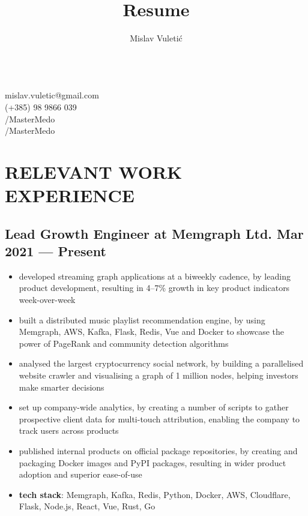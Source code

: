 \documentclass{article}
\begin{document}
\title{Resume}
\author{Mislav Vuletić}

\begin{multicols}{2}
  \fontsize{20}{20}\bfseries
  \theauthor{}

  \fontsize{15}{15}\mdseries
  \mbox{}\\
   mislav.vuletic@gmail.com\\
   (+385) 98 9866 039\\
  /MasterMedo\\
  /MasterMedo
\end{multicols}

\normalsize

\section{RELEVANT WORK EXPERIENCE}
\subsection{Lead Growth Engineer at Memgraph Ltd. \hfill Mar 2021 --- Present}
\begin{itemize}
  \itemsep0em
  \item developed streaming graph applications at a biweekly cadence, by leading product development, resulting in 4--7\% growth in key product indicators week-over-week
  \item built a distributed music playlist recommendation engine, by using Memgraph, AWS, Kafka, Flask, Redis, Vue and Docker to showcase the power of PageRank and community detection algorithms
  \item analysed the largest cryptocurrency social network, by building a parallelised website crawler and visualising a graph of 1 million nodes, helping investors make smarter decisions
  \item set up company-wide analytics, by creating a number of scripts to gather prospective client data for multi-touch attribution, enabling the company to track users across products
  \item published internal products on official package repositories, by creating and packaging Docker images and PyPI packages, resulting in wider product adoption and superior ease-of-use
  \item {\bfseries tech stack}: Memgraph, Kafka, Redis, Python, Docker, AWS, Cloudflare, Flask, Node.js, React, Vue, Rust, Go
\end{itemize}
\end{document}
